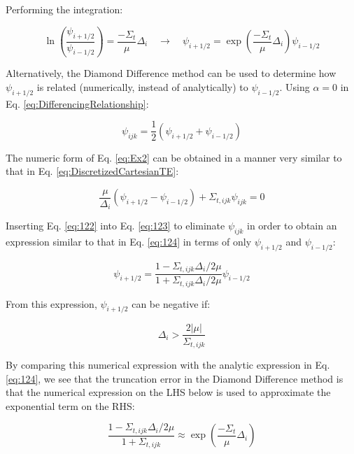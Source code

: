 \documentclass[10pt]{article}
\begin{document}
\begin{flushleft}
\begin{tcolorbox}[breakable]
Performing the integration:

\begin{equation}
\label{eq:124}
\ln{\left(\frac{\psi_{i+1/2}}{\psi_{i-1/2}}\right)}=\frac{-\Sigma_t}{\mu}\Delta_i\quad\rightarrow\quad\psi_{i+1/2}=\exp{\left(\frac{-\Sigma_t}{\mu}\Delta_i\right)}\psi_{i-1/2}
\end{equation}

Alternatively, the Diamond Difference method can be used to determine how \(\psi_{i+1/2}\) is related (numerically, instead of analytically) to \(\psi_{i-1/2}\). Using \(\alpha=0\) in Eq. \eqref{eq:DifferencingRelationship}:

\begin{equation}
\label{eq:122}
\psi_{ijk}=\frac{1}{2}\left(\psi_{i+1/2}+\psi_{i-1/2}\right)
\end{equation}

The numeric form of Eq. \eqref{eq:Ex2} can be obtained in a manner very similar to that in Eq. \eqref{eq:DiscretizedCartesianTE}:

\begin{equation}
\label{eq:123}
\frac{\mu}{\Delta_i}(\psi_{i+1/2}-\psi_{i-1/2})+\Sigma_{t,ijk}\psi_{ijk}=0
\end{equation}

Inserting Eq. \eqref{eq:122} into Eq. \eqref{eq:123} to eliminate \(\psi_{ijk}\) in order to obtain an expression similar to that in Eq. \eqref{eq:124} in terms of only \(\psi_{i+1/2}\) and \(\psi_{i-1/2}\):

\begin{equation}
\psi_{i+1/2}=\frac{1-\Sigma_{t,ijk}\Delta_i/2\mu}{1+\Sigma_{t,ijk}\Delta_i/2\mu}\psi_{i-1/2}
\end{equation}

From this expression, \(\psi_{i+1/2}\) can be negative if:

\begin{equation}
\Delta_i>\frac{2|\mu|}{\Sigma_{t,ijk}}
\end{equation}

By comparing this numerical expression with the analytic expression in Eq. \eqref{eq:124}, we see that the truncation error in the Diamond Difference method is that the numerical expression on the LHS below is used to approximate the exponential term on the RHS:

\begin{equation}
\label{eq:125}
\frac{1-\Sigma_{t,ijk}\Delta_i/2\mu}{1+\Sigma_{t,ijk}}\approx\exp{\left(\frac{-\Sigma_t}{\mu}\Delta_i\right)}
\end{equation}


\end{tcolorbox}
\end{flushleft}
\end{document}

